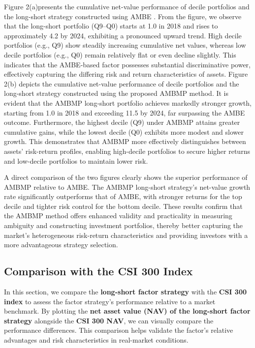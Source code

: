 \documentclass[preprint,12pt,authoryear]{elsarticle}
\begin{document}
Figure 2(a)presents the cumulative net-value performance of decile portfolios and the long-short strategy constructed using AMBE . From the figure, we observe that the long-short portfolio (Q9--Q0)
starts at 1.0 in 2018 and rises to approximately 4.2 by 2024, exhibiting a pronounced upward trend. High decile portfolios (e.g., Q9) show steadily increasing cumulative net values, whereas low decile portfolios (e.g., Q0) remain relatively flat or even decline slightly. This indicates that the AMBE-based factor possesses substantial discriminative power, effectively capturing the differing risk and return characteristics of assets. Figure 2(b) depicts the cumulative net-value performance of decile portfolios and the long-short strategy constructed using the proposed AMBMP method. It
is evident that the AMBMP long-short portfolio achieves markedly stronger growth, starting from 1.0 in 2018 and exceeding 11.5 by 2024, far surpassing the AMBE outcome. Furthermore, the highest decile (Q9) under AMBMP attains greater cumulative gains, while the lowest decile (Q0) exhibits more modest and slower growth. This demonstrates that AMBMP more effectively distinguishes between assets’ risk-return profiles, enabling high-decile portfolios to secure higher returns and low-decile portfolios to maintain lower risk.

A direct comparison of the two figures clearly shows the superior
performance of AMBMP relative to AMBE. The AMBMP long-short strategy’s
net-value growth rate significantly outperforms that of AMBE, with stronger returns for the top decile and tighter risk control for the bottom decile. These results confirm that the AMBMP method offers enhanced validity and practicality in measuring ambiguity and constructing investment portfolios, thereby better capturing the market’s heterogeneous risk-return characteristics and providing investors with a more advantageous strategy selection.



\subsection{Comparison with the CSI 300 Index}
In this section, we compare the \textbf{long-short factor strategy} with the \textbf{CSI 300 index} to assess the factor strategy's performance relative to a market benchmark. By plotting the \textbf{net asset value (NAV) of the long-short factor strategy} alongside the \textbf{CSI 300 NAV}, we can visually compare the performance differences. This comparison helps validate the factor's relative advantages and risk characteristics in real-market conditions.
\end{document}
